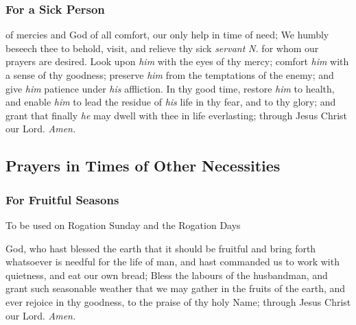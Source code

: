 \subsubsection{For a Sick Person}
 of mercies and God of all comfort, our only help in time of need; We humbly beseech thee to behold, visit, and relieve thy sick \textit{servant} \textit{N.} for whom our prayers are desired. Look upon \textit{him} with the eyes of thy mercy; comfort \textit{him} with a sense of thy goodness; preserve \textit{him} from the temptations of the enemy; and give \textit{him} patience under \textit{his} affliction. In thy good time, restore \textit{him} to health, and enable \textit{him} to lead the residue of \textit{his} life in thy fear, and to thy glory; and grant that finally \textit{he} may dwell with thee in life everlasting; through Jesus Christ our Lord. \textit{Amen.}


\subsection{Prayers in Times of Other Necessities}

\subsubsection{For Fruitful Seasons}
\begin{rubric}
	{To be used on Rogation Sunday and the Rogation Days}
\end{rubric}
 God, who hast blessed the earth that it should be fruitful and bring forth whatsoever is needful for the life of man, and hast commanded us to work with quietness, and eat our own bread; Bless the labours of the husbandman, and grant such seasonable weather that we may gather in the fruits of the earth, and ever rejoice in thy goodness, to the praise of thy holy Name; through Jesus Christ our Lord. \textit{Amen.}

